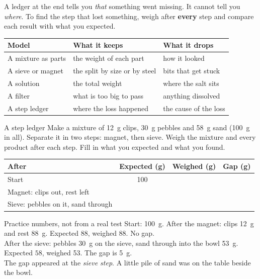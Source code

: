 \label{ch6}

A ledger at the end tells you \emph{that} something went missing. It cannot tell you \emph{where}. To find the step that lost something, weigh after \textbf{every} step and compare each result with what you expected.

\begin{center}
\sffamily\small\renewcommand{\arraystretch}{1.5}
\begin{tabular}{@{}p{3.4cm}p{3.7cm}p{3.7cm}@{}}
\toprule
\textbf{Model} & \textbf{What it keeps} & \textbf{What it drops}\\
\midrule
A mixture as parts & the weight of each part & how it looked\\
A sieve or magnet & the split by size or by steel & bits that get stuck\\
A solution & the total weight & where the salt sits\\
A filter & what is too big to pass & anything dissolved\\
A step ledger & where the loss happened & the cause of the loss\\
\bottomrule
\end{tabular}
\end{center}

\begin{tryit}{A step ledger}
Make a mixture of 12~g clips, 30~g pebbles and 58~g sand (100~g in all). Separate it in two steps: magnet, then sieve. Weigh the mixture and every product after each step. Fill in what you expected and what you found.\par\medskip
\renewcommand{\arraystretch}{1.6}
\begin{tabular}{|l|c|c|c|}
\hline
\textbf{After} & \textbf{Expected (g)} & \textbf{Weighed (g)} & \textbf{Gap (g)}\\ \hline
Start & 100 & & \\ \hline
Magnet: clips out, rest left & & & \\ \hline
Sieve: pebbles on it, sand through & & & \\ \hline
\end{tabular}
\end{tryit}

\begin{worked}{Practice numbers, not from a real test}
Start: 100~g. After the magnet: clips 12~g and rest 88~g. Expected 88, weighed 88. No gap.\\
After the sieve: pebbles 30~g on the sieve, sand through into the bowl 53~g. Expected $58$, weighed 53. The gap is 5~g.\\
The gap appeared at the \emph{sieve step}. A little pile of sand was on the table beside the bowl.
\end{worked}

